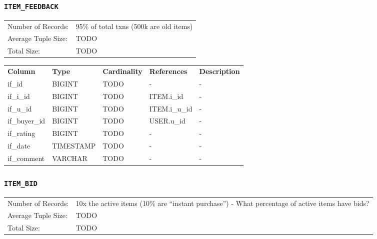 \documentclass[a4paper,10pt]{article}
\begin{document}
\subsubsection{\texttt{ITEM\_FEEDBACK}}

\begin{tabular}{ll}
Number of Records:      & 95\% of total txns (500k are old items) \\
Average Tuple Size:     & TODO \\
Total Size:             & TODO \\
\end{tabular}

\vspace*{0.1in}

\noindent \begin{tabular*}{\textwidth}{@{\extracolsep{\fill}} lllll}
\textbf{Column} & \textbf{Type} & \textbf{Cardinality} & \textbf{References} & \textbf{Description} \\
if\_id             & BIGINT     & TODO & -               & - \\
if\_i\_id          & BIGINT     & TODO & ITEM.i\_id      & - \\
if\_u\_id          & BIGINT     & TODO & ITEM.i\_u\_id   & - \\
if\_buyer\_id      & BIGINT     & TODO & USER.u\_id      & - \\
if\_rating         & BIGINT     & TODO & -               & - \\
if\_date           & TIMESTAMP  & TODO & -               & - \\
if\_comment        & VARCHAR    & TODO & -               & - \\
\end{tabular*}

\subsubsection{\texttt{ITEM\_BID}}

\begin{tabular}{ll}
Number of Records:      & 10x the active items (10\% are ``instant purchase'') - What percentage of active items have bids? \\
Average Tuple Size:     & TODO \\
Total Size:             & TODO \\
\end{tabular}

\vspace*{0.1in}
\end{document}
